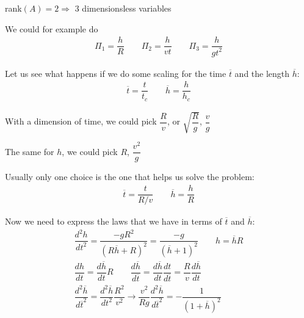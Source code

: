 \noindent rank$(A) = 2\Rightarrow$ 3 dimensionsless variables\par
\noindent We could for example do 
\begin{equation*}
  \begin{gathered}
    \Pi_1 = \dfrac{h}{R}\qquad\Pi_2 = \dfrac{h}{vt}\qquad\Pi_3 = \dfrac{h}{gt^2}
  \end{gathered}
\end{equation*}
\par\bigskip
\noindent Let us see what happens if we do some scaling for the time $\overline{t}$ and the length $\overline{h}$:
\begin{equation*}
  \begin{gathered}
    \overline{t} = \dfrac{t}{t_c}\qquad \overline{h} = \dfrac{h}{h_c}
  \end{gathered}
\end{equation*}\par
\noindent With a dimension of time, we could pick $\dfrac{R}{v}$, or $\sqrt{\dfrac{R}{g}}$, $\dfrac{v}{g}$\par
\noindent The same for $h$, we could pick $R$, $\dfrac{v^2}{g}$ 
\par\bigskip
\noindent Usually only one choice is the one that helps us solve the problem:
\begin{equation*}
  \begin{gathered}
    \overline{t} = \dfrac{t}{R/v}\qquad \overline{h} = \dfrac{h}{R}
  \end{gathered}
\end{equation*}\par
\noindent Now we need to express the laws that we have in terms of $\overline{t}$ and $\overline{h}$:
\begin{equation*}
  \begin{gathered}
    \dfrac{d^2h}{dt^2} = \dfrac{-gR^2}{(R\overline{h}+R)^2} = \dfrac{-g}{(\overline{h}+1)^2}\qquad h= \overline{h}R\\
    \dfrac{dh}{dt} = \dfrac{d\overline{h}}{dt}R\qquad\dfrac{d\overline{h}}{d\overline{t}} = \dfrac{d\overline{h}}{dt}\dfrac{dt}{d\overline{t}} = \dfrac{R}{v}\dfrac{d\overline{h}}{dt}\\
    \dfrac{d^2\overline{h}}{d\overline{t}^2} = \dfrac{d^2\overline{h}}{dt^2}\dfrac{R^2}{v^2}\rightarrow \dfrac{v^2}{Rg}\dfrac{d^2\overline{h}}{d\overline{t}^2} = -\dfrac{1}{(1+\overline{h})^2}
  \end{gathered}
\end{equation*}\par
